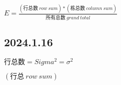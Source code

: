 \documentclass{book}        %
\date{}
\begin{document}

\(E = \frac{(\mbox{行总数}\ row\ sum) * (\mbox{栋总数}\ column\ sum)} {\mbox{所有总数}\ grand\ total}\)

\hypertarget{section}{%
\subsection{2024.1.16}\label{section}}

\(\mbox{行总数} = Sigma^2 = \sigma ^2\)

\((\mbox{行总}\  row \  sum)\)
\end{document}
